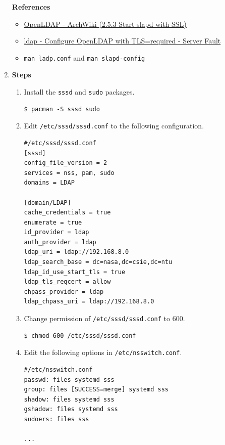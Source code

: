 \documentclass[12pt, a4paper]{article}
\begin{document}
\begin{enumerate}[label=(\alph*)]
    \pagebreak
    \textbf{References}
    \begin{itemize}
      \item \href{https://wiki.archlinux.org/title/openLDAP#Start_slapd_with_SSL}{OpenLDAP - ArchWiki (2.5.3 Start slapd with SSL)}
      \item \href{https://serverfault.com/questions/459718/configure-openldap-with-tls-required}{ldap - Configure OpenLDAP with TLS=required - Server Fault}
      \item \verb|man ladp.conf| and \verb|man slapd-config|
    \end{itemize}

    \item \textbf{Steps}
    \begin{enumerate}[label=(\arabic*)]
      \item Install the \verb|sssd| and \verb|sudo| packages.
      \begin{Verbatim}[frame=single]
$ pacman -S sssd sudo
      \end{Verbatim}

      \item Edit \verb|/etc/sssd/sssd.conf| to the following configuration.
      \begin{Verbatim}[frame=single, fontsize=\footnotesize]
#/etc/sssd/sssd.conf
[sssd]
config_file_version = 2
services = nss, pam, sudo
domains = LDAP

[domain/LDAP]
cache_credentials = true
enumerate = true
id_provider = ldap
auth_provider = ldap
ldap_uri = ldap://192.168.8.0
ldap_search_base = dc=nasa,dc=csie,dc=ntu
ldap_id_use_start_tls = true
ldap_tls_reqcert = allow
chpass_provider = ldap
ldap_chpass_uri = ldap://192.168.8.0
      \end{Verbatim}
      \item Change permission of \verb|/etc/sssd/sssd.conf| to 600.
      \begin{Verbatim}[frame=single]
$ chmod 600 /etc/sssd/sssd.conf
      \end{Verbatim}

      \item Edit the following options in  \verb|/etc/nsswitch.conf|.
      \begin{Verbatim}[frame=single, fontsize=\footnotesize]
#/etc/nsswitch.conf
passwd: files systemd sss
group: files [SUCCESS=merge] systemd sss
shadow: files systemd sss
gshadow: files systemd sss
sudoers: files sss

...
      \end{Verbatim}


\end{enumerate}
\end{enumerate}
\end{document}
